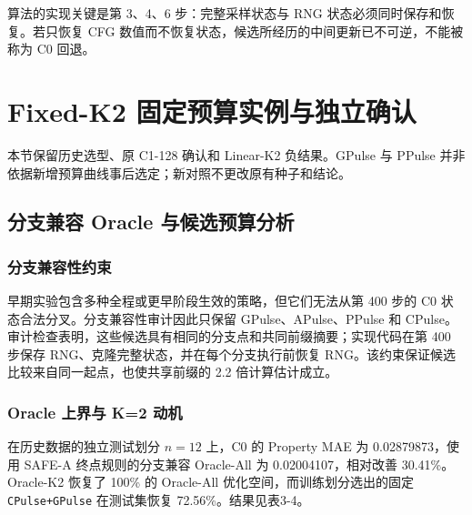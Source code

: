 算法的实现关键是第 3、4、6 步：完整采样状态与 RNG 状态必须同时保存和恢复。若只恢复 CFG 数值而不恢复状态，候选所经历的中间更新已不可逆，不能被称为 C0 回退。

\section{Fixed-K2 固定预算实例与独立确认}

本节保留历史选型、原 C1-128 确认和 Linear-K2 负结果。GPulse 与 PPulse 并非依据新增预算曲线事后选定；新对照不更改原有种子和结论。

\subsection{分支兼容 Oracle 与候选预算分析}

\subsubsection{分支兼容性约束}

早期实验包含多种全程或更早阶段生效的策略，但它们无法从第 400 步的 C0 状态合法分叉。分支兼容性审计因此只保留 GPulse、APulse、PPulse 和 CPulse。审计检查表明，这些候选具有相同的分支点和共同前缀摘要；实现代码在第 400 步保存 RNG、克隆完整状态，并在每个分支执行前恢复 RNG。该约束保证候选比较来自同一起点，也使共享前缀的 2.2 倍计算估计成立。

\subsubsection{Oracle 上界与 K=2 动机}

在历史数据的独立测试划分 \(n=12\) 上，C0 的 Property MAE 为 0.02879873，使用 SAFE-A 终点规则的分支兼容 Oracle-All 为 0.02004107，相对改善 30.41\%。Oracle-K2 恢复了 100\% 的 Oracle-All 优化空间，而训练划分选出的固定 \texttt{CPulse+GPulse} 在测试集恢复 72.56\%。结果见表3-4。


